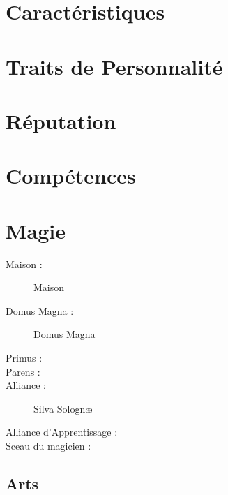 \section*{Caractéristiques}


\caractableMP

\begin{multicols*}{2}

\longVFQs

\section*{Traits de Personnalité}

\traitslong

\section*{Réputation}

\reputationslong



\section*{Compétences}

\abilitieslong

\end{multicols*}

\pagebreak

\section*{Magie}
\begin{multicols}{2}
\begin{description}
\item[Maison :] Maison
\item[Domus Magna :] Domus Magna
\item[Primus :]
\item[Parens :]
\item[Alliance :] Silva Solognæ
\item[Alliance d'Apprentissage :]
\item[Sceau du magicien :] \magussigil
\end{description}
\end{multicols}
\subsection*{Arts}

